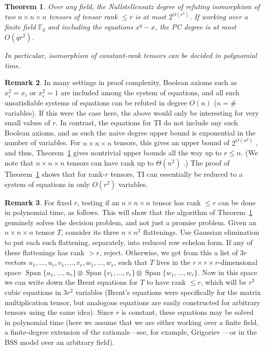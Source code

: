 \documentclass[10pt,a4paper]{article}
\newtheorem{theorem}{Theorem}[section]
\theoremstyle{definition}
\newtheorem{remark}[theorem]{Remark}
\DeclareMathOperator{\Span}{Span}
\newcommand{\F}{\mathbb{F}}
\begin{document}
\begin{theorem} \label{thm:upper}
Over any field, the Nullstellensatz degree of refuting isomorphism of two $n \times n \times n$ tensors of tensor rank $\leq r$ is at most $2^{O(r^2)}$. If working over a finite field $\F_q$ and including the equations $x^q - x$, the PC degree is at most $O(qr^2)$. 

In particular, isomorphism of constant-rank tensors can be decided in polynomial time.
\end{theorem}


\begin{remark} \label{rmk:boolean}
In many settings in proof complexity, Boolean axioms such as $x_i^2 = x_i$ or $x_i^2 = 1$ are included among the system of equations, and all such unsatisfiable systems of equations can be refuted in degree $O(n)$ ($n=$\# variables). If this were the case here, the above would only be interesting for very small values of $r$. In contrast, the equations for \textsc{TI} do not include any such Boolean axioms, and as such the naive degree upper bound is exponential in the number of variables. For $n \times n \times n$ tensors, this gives an upper bound of $2^{O(n^2)}$ \cite{sombra}, and thus, Theorem~\ref{thm:upper} gives nontrivial upper bounds all the way up to $r \leq n$. (We note that $n \times n \times n$ tensors can have rank up to $\Theta(n^2)$ \cite{lickteigTypical}.) The proof of Theorem~\ref{thm:upper} shows that for rank-$r$ tensors, \textsc{TI} can essentially be reduced to a system of equations in only $O(r^2)$ variables.
\end{remark}

\begin{remark} \label{rmk:rank}
For fixed $r$, testing if an $n \times n \times n$ tensor has rank $\leq r$ can be done in polynomial time, as follows. This will show that the algorithm of Theorem~\ref{thm:upper} genuinely solves the decision problem, and not just a promise problem. Given an $n \times n \times n$ tensor $T$, consider its three $n \times n^2$ flattenings. Use Gaussian elimination to put each such flattening, separately, into reduced row echelon form. If any of these flattenings has rank $> r$, reject. Otherwise, we get from this a list of $3r$ vectors $u_1, \dotsc, u_r, v_1, \dotsc, v_r, w_1, \dotsc, w_r$, such that $T$ lives in the $r \times r \times r$-dimensional space $\Span\{u_1, \dotsc, u_r\} \otimes \Span\{v_1, \dotsc, v_r\} \otimes \Span\{w_1, \dotsc, w_r\}$. Now in this space we can write down the Brent equations \cite{brent} for $T$ to have rank $\leq r$, which will be $r^3$ cubic equations in $3r^2$ variables (Brent's equations \cite[(5.06)]{brent} were specifically for the matrix multiplication tensor, but analogous equations are easily constructed for arbitrary tensors using the same idea). Since $r$ is constant, these equations may be solved in polynomial time (here we assume that we are either working over a finite field, a finite-degree extension of the rationals---see, for example, Grigoriev \cite{grigoriev}---or in the BSS model over an arbitrary field).
\end{remark}
\end{document}

